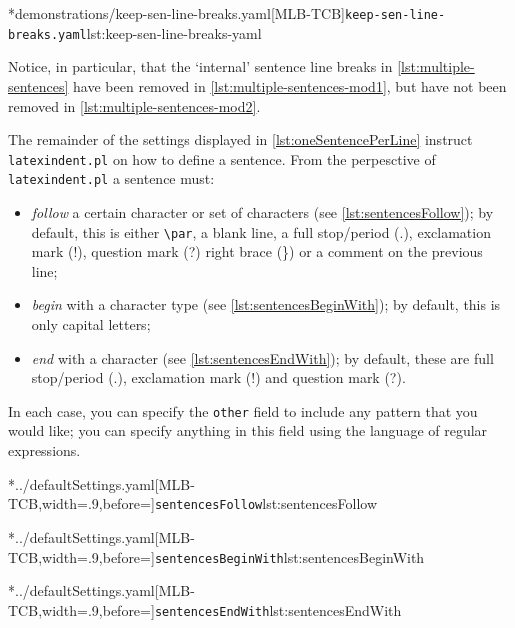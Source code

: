 	\begin{minipage}{.5\linewidth}
	\end{minipage}
	\hfill
	\begin{minipage}{.5\linewidth}
		\cmhlistingsfromfile[style=yaml-LST]*{demonstrations/keep-sen-line-breaks.yaml}[MLB-TCB]{\texttt{keep-sen-line-breaks.yaml}}{lst:keep-sen-line-breaks-yaml}
	\end{minipage}

	Notice, in particular, that the `internal' sentence line breaks in
	\cref{lst:multiple-sentences} have been removed in \cref{lst:multiple-sentences-mod1}, but have
	not been removed in \cref{lst:multiple-sentences-mod2}.

	The remainder of the settings displayed in \vref{lst:oneSentencePerLine} instruct
	\texttt{latexindent.pl} on how to define a sentence. From the perpesctive of
	\texttt{latexindent.pl} a sentence must:
	\begin{itemize}
		\item \emph{follow} a certain character or set of characters (see
		      \cref{lst:sentencesFollow}); by default, this is either \lstinline!\par!, a
		      blank line, a full stop/period (.), exclamation mark (!), question mark (?) right brace
		      (\}) or a comment on the previous line;
		\item \emph{begin} with a character type (see \cref{lst:sentencesBeginWith}); by
		      default, this is only capital letters;
		\item \emph{end} with a character (see \cref{lst:sentencesEndWith}); by
		      default, these are full stop/period (.), exclamation mark (!) and question mark (?).
	\end{itemize}
	In each case, you can specify the \texttt{other} field to include any
	pattern that you would like; you can specify anything in this field using the language of
	regular expressions.

	\begin{adjustwidth}{-3.5cm}{-2.5cm}
		\begin{minipage}{.36\linewidth}
			\cmhlistingsfromfile[style=sentencesFollow]*{../defaultSettings.yaml}[MLB-TCB,width=.9\linewidth,before=\centering]{\texttt{sentencesFollow}}{lst:sentencesFollow}
		\end{minipage}
		\hfill
		\begin{minipage}{.31\linewidth}
			\cmhlistingsfromfile[style=sentencesBeginWith]*{../defaultSettings.yaml}[MLB-TCB,width=.9\linewidth,before=\centering]{\texttt{sentencesBeginWith}}{lst:sentencesBeginWith}
		\end{minipage}
		\hfill
		\begin{minipage}{.31\linewidth}
			\cmhlistingsfromfile[style=sentencesEndWith]*{../defaultSettings.yaml}[MLB-TCB,width=.9\linewidth,before=\centering]{\texttt{sentencesEndWith}}{lst:sentencesEndWith}
		\end{minipage}
	\end{adjustwidth}

